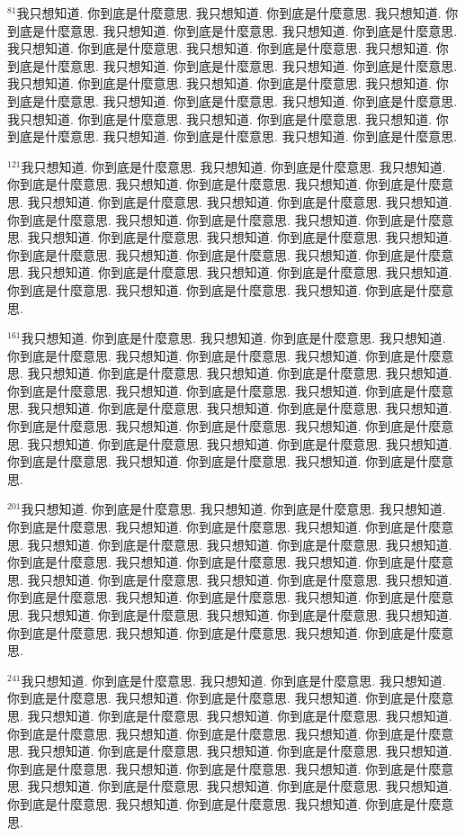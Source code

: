 \documentclass{book}
\begin{document}
$^{81}$我只想知道.
你到底是什麼意思.
我只想知道.
你到底是什麼意思.
我只想知道.
你到底是什麼意思.
我只想知道.
你到底是什麼意思.
我只想知道.
你到底是什麼意思.
我只想知道.
你到底是什麼意思.
我只想知道.
你到底是什麼意思.
我只想知道.
你到底是什麼意思.
我只想知道.
你到底是什麼意思.
我只想知道.
你到底是什麼意思.
我只想知道.
你到底是什麼意思.
我只想知道.
你到底是什麼意思.
我只想知道.
你到底是什麼意思.
我只想知道.
你到底是什麼意思.
我只想知道.
你到底是什麼意思.
我只想知道.
你到底是什麼意思.
我只想知道.
你到底是什麼意思.
我只想知道.
你到底是什麼意思.
我只想知道.
你到底是什麼意思.
我只想知道.
你到底是什麼意思.

$^{121}$我只想知道.
你到底是什麼意思.
我只想知道.
你到底是什麼意思.
我只想知道.
你到底是什麼意思.
我只想知道.
你到底是什麼意思.
我只想知道.
你到底是什麼意思.
我只想知道.
你到底是什麼意思.
我只想知道.
你到底是什麼意思.
我只想知道.
你到底是什麼意思.
我只想知道.
你到底是什麼意思.
我只想知道.
你到底是什麼意思.
我只想知道.
你到底是什麼意思.
我只想知道.
你到底是什麼意思.
我只想知道.
你到底是什麼意思.
我只想知道.
你到底是什麼意思.
我只想知道.
你到底是什麼意思.
我只想知道.
你到底是什麼意思.
我只想知道.
你到底是什麼意思.
我只想知道.
你到底是什麼意思.
我只想知道.
你到底是什麼意思.
我只想知道.
你到底是什麼意思.

$^{161}$我只想知道.
你到底是什麼意思.
我只想知道.
你到底是什麼意思.
我只想知道.
你到底是什麼意思.
我只想知道.
你到底是什麼意思.
我只想知道.
你到底是什麼意思.
我只想知道.
你到底是什麼意思.
我只想知道.
你到底是什麼意思.
我只想知道.
你到底是什麼意思.
我只想知道.
你到底是什麼意思.
我只想知道.
你到底是什麼意思.
我只想知道.
你到底是什麼意思.
我只想知道.
你到底是什麼意思.
我只想知道.
你到底是什麼意思.
我只想知道.
你到底是什麼意思.
我只想知道.
你到底是什麼意思.
我只想知道.
你到底是什麼意思.
我只想知道.
你到底是什麼意思.
我只想知道.
你到底是什麼意思.
我只想知道.
你到底是什麼意思.
我只想知道.
你到底是什麼意思.

$^{201}$我只想知道.
你到底是什麼意思.
我只想知道.
你到底是什麼意思.
我只想知道.
你到底是什麼意思.
我只想知道.
你到底是什麼意思.
我只想知道.
你到底是什麼意思.
我只想知道.
你到底是什麼意思.
我只想知道.
你到底是什麼意思.
我只想知道.
你到底是什麼意思.
我只想知道.
你到底是什麼意思.
我只想知道.
你到底是什麼意思.
我只想知道.
你到底是什麼意思.
我只想知道.
你到底是什麼意思.
我只想知道.
你到底是什麼意思.
我只想知道.
你到底是什麼意思.
我只想知道.
你到底是什麼意思.
我只想知道.
你到底是什麼意思.
我只想知道.
你到底是什麼意思.
我只想知道.
你到底是什麼意思.
我只想知道.
你到底是什麼意思.
我只想知道.
你到底是什麼意思.

$^{241}$我只想知道.
你到底是什麼意思.
我只想知道.
你到底是什麼意思.
我只想知道.
你到底是什麼意思.
我只想知道.
你到底是什麼意思.
我只想知道.
你到底是什麼意思.
我只想知道.
你到底是什麼意思.
我只想知道.
你到底是什麼意思.
我只想知道.
你到底是什麼意思.
我只想知道.
你到底是什麼意思.
我只想知道.
你到底是什麼意思.
我只想知道.
你到底是什麼意思.
我只想知道.
你到底是什麼意思.
我只想知道.
你到底是什麼意思.
我只想知道.
你到底是什麼意思.
我只想知道.
你到底是什麼意思.
我只想知道.
你到底是什麼意思.
我只想知道.
你到底是什麼意思.
我只想知道.
你到底是什麼意思.
我只想知道.
你到底是什麼意思.
我只想知道.
你到底是什麼意思.
\end{document}
